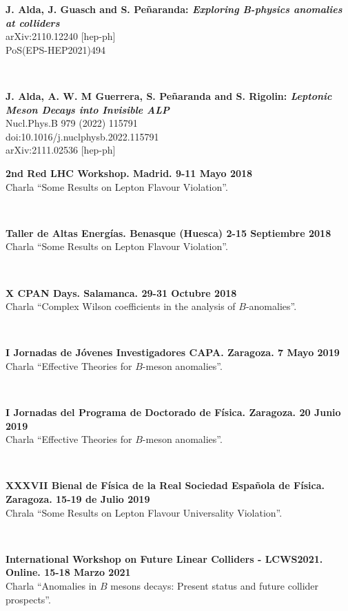 \documentclass[combined.tex]{subfiles}
\begin{document}
\textbf{J. Alda, J. Guasch and S. Peñaranda: \textit{Exploring B-physics anomalies at colliders}}\\
arXiv:2110.12240 [hep-ph]\\
PoS(EPS-HEP2021)494

~

\textbf{J. Alda, A. W. M Guerrera, S. Peñaranda and S. Rigolin: \textit{Leptonic Meson Decays into Invisible ALP}}\\
Nucl.Phys.B 979 (2022) 115791\\
doi:10.1016/j.nuclphysb.2022.115791\\
arXiv:2111.02536 [hep-ph]


\hspace{\parindent}\textbf{2nd Red LHC Workshop. Madrid. 9-11 Mayo 2018}\\
Charla ``Some Results on Lepton Flavour Violation''.

~

\textbf{Taller de Altas Energías. Benasque (Huesca) 2-15 Septiembre 2018}\\
Charla ``Some Results on Lepton Flavour Violation''.

~

\textbf{X CPAN Days. Salamanca. 29-31 Octubre 2018}\\
Charla ``Complex Wilson coefficients in the analysis of $B$-anomalies''.

~

\textbf{I Jornadas de Jóvenes Investigadores CAPA. Zaragoza. 7 Mayo 2019}\\
Charla ``Effective Theories for $B$-meson anomalies''.

~

\textbf{I Jornadas del Programa de Doctorado de Física. Zaragoza. 20 Junio 2019}\\
Charla ``Effective Theories for $B$-meson anomalies''.

~

\textbf{XXXVII Bienal de Física de la Real Sociedad Española de Física. Zaragoza. 15-19 de Julio 2019}\\
Chrala ``Some Results on Lepton Flavour Universality Violation''.

~

\textbf{International Workshop on Future Linear Colliders - LCWS2021. Online. 15-18 Marzo 2021}\\
Charla ``Anomalies in $B$ mesons decays: Present status and future collider prospects''.
\end{document}
